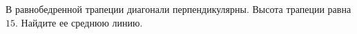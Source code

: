 \begin{ex}
	\begin{condition}
		В равнобедренной трапеции диагонали перпендикулярны. Высота трапеции равна \( 15 \). Найдите ее среднюю линию.
	\end{condition}
\end{ex}